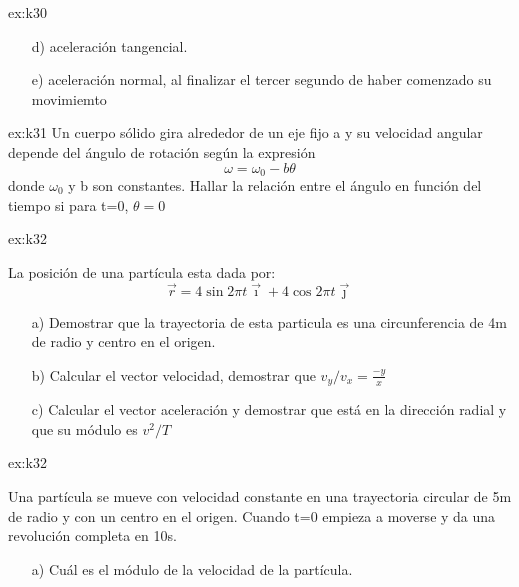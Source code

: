 \begin{multicols}{2}
\begin{excercise}[][][a) $\omega=2\ \mathrm{rads^{-1}}$, b) $v=0.4\ \mathrm{ms^{-1}}$; c)  $\alpha=-2\ \mathrm{rads^{-2}}$,  d) $a_t=-0.4\ \mathrm{ms^{-2}}$; e) $a_n=0.8\ \mathrm{ms^{-1}}$]{ex:k30}
{\begin{itemize}
             \item[d)] aceleración tangencial.
             \item[e)] aceleración normal, al finalizar el tercer segundo de haber comenzado su movimiemto 
         \end{itemize}
         }
    \end{excercise}
    \begin{excercise}[][][ $\theta(t)=\frac{\omega_0}{b}(1-e^{-bt})$;]{ex:k31}{
         Un cuerpo sólido gira alrededor de un eje fijo a y su velocidad angular depende del ángulo de rotación según la expresión 
         \begin{equation*}
             \omega=\omega_0-b\theta 
         \end{equation*}
         donde $\omega_0$ y b son constantes. Hallar la relación entre el ángulo en función del tiempo si para t=0, $\theta=0$
         }
    \end{excercise}
    \begin{excercise}[][][;]{ex:k32}{
         La posición de una partícula esta dada por:
         \begin{equation*}
             \vec{r}=4\sin{2\pi t}\vec{\imath}+4\cos{2\pi t}\vec{\jmath}
         \end{equation*}
         \begin{itemize}
             \item[a)] Demostrar que la trayectoria de esta particula es una circunferencia de 4m de radio y centro en el origen.
             \item[b)] Calcular el vector velocidad, demostrar que $v_y/v_x=\frac{-y}{x}$
             \item[c)] Calcular el vector aceleración y demostrar que está en la dirección radial y que su módulo es $v^2/T$
         \end{itemize}
         }
    \end{excercise}
    \begin{excercise}[][][]{ex:k32}{
         Una partícula se mueve con velocidad constante en una trayectoria circular de 5m de radio y con un centro en el origen. Cuando t=0 empieza a moverse y da una revolución completa en 10s. 
         \begin{itemize}
            \item[a)] Cuál es el módulo de la velocidad de la  partícula.

\end{itemize}}
\end{excercise}
\end{multicols}
